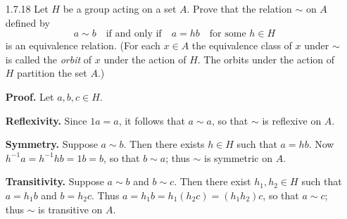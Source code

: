 \begin{enumerate}
      \textbf{Proof.} Let $g \in G$. Define $\sigma_g : G \rightarrow G$ by
      $x \mapsto gxg^{-1}$. This map is bijective since it has a 2-sided
      inverse, namely $\sigma_{g^{-1}}$. So it remains to show that $\sigma_g$
      is a homomorphism. This follows immediately because
      \begin{align*}
         \sigma_g(xy) = gxyg^{-1} = gxg^{-1}gyg^{-1} = \sigma_g(x)\sigma_g(y)
      \end{align*}
      for all $x, y \in G$. By Exercise 1.6.2, it follows that
      $|x| = |\sigma_g(x)| = |gxg^{-1}|$ for all $x \in G$. Let $A \subseteq G$.
      Then the map $\alpha_g : A \rightarrow gAg^{-1}$ defined by
      $a \mapsto gag^{-1}$ is also bijective (its 2-sided inverse is
      $\alpha_{g^{-1}}$); thus $|A| = |gAg^{-1}|$. \qed      
   \item[1.7.18]  Let $H$ be a group acting on a set $A$. Prove that the
                  relation $\sim$ on $A$ defined by
                  $$a \sim b \quad \text{if and only if} \quad
                    a = hb \quad \text{for some }h \in H$$
                  is an equivalence relation. (For each $x \in A$ the
                  equivalence class of $x$ under $\sim$ is called the
                  \textit{orbit} of $x$ under the action of $H$. The orbits
                  under the action of $H$ partition the set $A$.)

      \textbf{Proof.} Let $a, b, c \in H$.

      \textbf{Reflexivity.} Since $1a = a$, it follows that $a \sim a$, so that
      $\sim$ is reflexive on $A$.

      \textbf{Symmetry.} Suppose $a \sim b$. Then there exists $h \in H$ such
      that $a = hb$. Now $h^{-1}a = h^{-1}hb = 1b = b$, so that $b \sim a$; thus
      $\sim$ is symmetric on $A$.

      \textbf{Transitivity.} Suppose $a \sim b$ and $b \sim c$. Then there exist
      $h_1, h_2 \in H$ such that $a = h_1b$ and $b = h_2c$. Thus
      $a = h_1b = h_1(h_2c) = (h_1h_2)c$, so that $a \sim c$; thus $\sim$ is 
      transitive on $A$.


\end{enumerate}
